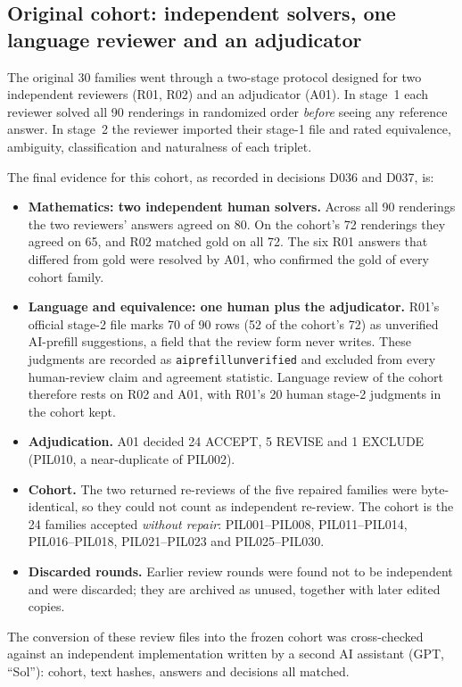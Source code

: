 \documentclass[12pt,a4paper,oneside]{report}
\renewcommand{\_}{\oldunderscore\allowbreak}
\begin{document}
\subsection{Original cohort: independent solvers, one language reviewer and an adjudicator}

The original 30 families went through a two-stage protocol designed for two independent reviewers (R01, R02) and an adjudicator (A01). In stage~1 each reviewer solved all 90 renderings in randomized order \emph{before} seeing any reference answer. In stage~2 the reviewer imported their stage-1 file and rated equivalence, ambiguity, classification and naturalness of each triplet.

The final evidence for this cohort, as recorded in decisions D036 and D037, is:
\begin{itemize}[nosep]
\item \textbf{Mathematics: two independent human solvers.} Across all 90 renderings the two reviewers' answers agreed on 80. On the cohort's 72 renderings they agreed on 65, and R02 matched gold on all 72. The six R01 answers that differed from gold were resolved by A01, who confirmed the gold of every cohort family.
\item \textbf{Language and equivalence: one human plus the adjudicator.} R01's official stage-2 file marks 70 of 90 rows (52 of the cohort's 72) as unverified AI-prefill suggestions, a field that the review form never writes. These judgments are recorded as \texttt{ai\_prefill\_unverified} and excluded from every human-review claim and agreement statistic. Language review of the cohort therefore rests on R02 and A01, with R01's 20 human stage-2 judgments in the cohort kept.
\item \textbf{Adjudication.} A01 decided 24 ACCEPT, 5 REVISE and 1 EXCLUDE (PIL010, a near-duplicate of PIL002).
\item \textbf{Cohort.} The two returned re-reviews of the five repaired families were byte-identical, so they could not count as independent re-review. The cohort is the 24 families accepted \emph{without repair}: PIL001--PIL008, PIL011--PIL014, PIL016--PIL018, PIL021--PIL023 and PIL025--PIL030.
\item \textbf{Discarded rounds.} Earlier review rounds were found not to be independent and were discarded; they are archived as unused, together with later edited copies.
\end{itemize}
The conversion of these review files into the frozen cohort was cross-checked against an independent implementation written by a second AI assistant (GPT, ``Sol''): cohort, text hashes, answers and decisions all matched.
\end{document}
